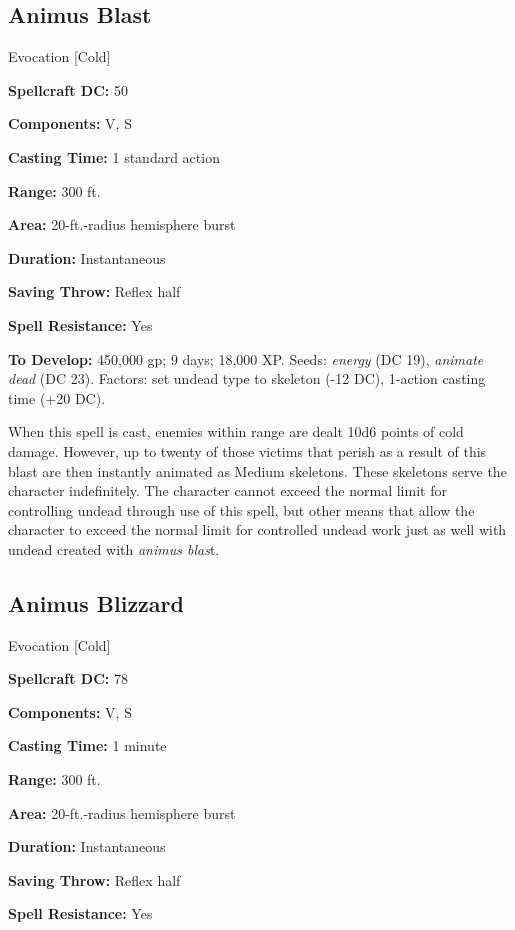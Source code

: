 \documentclass{article}
\begin{document}
\vspace{12pt}
\subsection*{Animus Blast }

Evocation [Cold] 

\textbf{Spellcraft DC:} 50 

\textbf{Components:} V, S 

\textbf{Casting Time:} 1 standard action 

\textbf{Range:} 300 ft. 

\textbf{Area:} 20-ft.-radius hemisphere burst 

\textbf{Duration:} Instantaneous 

\textbf{Saving Throw:} Reflex half 

\textbf{Spell Resistance:} Yes 

\textbf{To Develop:} 450,000 gp; 9 days; 18,000 XP. Seeds: \textit{energy }(DC 
19), \textit{animate dead }(DC 23). Factors: set undead type to skeleton (-12 DC), 
1-action casting time (+20 DC). 

When this spell is cast, enemies within range are dealt 10d6 points of cold damage. 
However, up to twenty of those victims that perish as a result of this blast are 
then instantly animated as Medium skeletons. These skeletons serve the character 
indefinitely. The character cannot exceed the normal limit for controlling undead 
through use of this spell, but other means that allow the character to exceed the 
normal limit for controlled undead work just as well with undead created with \textit{animus 
blas}t. 

\vspace{12pt}
\subsection*{Animus Blizzard }

Evocation [Cold] 

\textbf{Spellcraft DC:} 78 

\textbf{Components:} V, S 

\textbf{Casting Time:} 1 minute 

\textbf{Range:} 300 ft. 

\textbf{Area:} 20-ft.-radius hemisphere burst

\textbf{Duration:} Instantaneous 

\textbf{Saving Throw:} Reflex half 

\textbf{Spell Resistance:} Yes 
\end{document}
